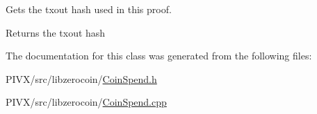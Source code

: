 Gets the txout hash used in this proof.

\begin{DoxyReturn}{Returns}
the txout hash 
\end{DoxyReturn}


The documentation for this class was generated from the following files\+:\begin{DoxyCompactItemize}
\item 
P\+I\+V\+X/src/libzerocoin/\mbox{\hyperlink{_coin_spend_8h}{Coin\+Spend.\+h}}\item 
P\+I\+V\+X/src/libzerocoin/\mbox{\hyperlink{_coin_spend_8cpp}{Coin\+Spend.\+cpp}}\end{DoxyCompactItemize}
